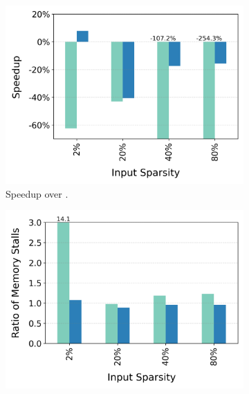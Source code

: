 \begin{figure}[t]
  \centering
  \begin{subfigure}{.33\textwidth}
        \centering
    \includegraphics[width=\textwidth]{Figures/Evaluations/single_if_few_scatter_speedup.png}
    \caption{Speedup over \ifconv.}
    \label{fig:single-if-few-scatter-over-ifConv}
  \end{subfigure}%
  \begin{subfigure}{.33\textwidth}
        \centering
    \includegraphics[width=\textwidth]{Figures/Evaluations/single_if_few_scatter_mem_stalls.png}

\end{subfigure}
\end{figure}
